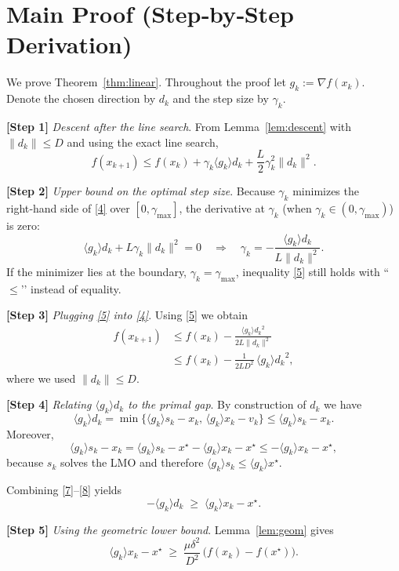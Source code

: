\documentclass{article}
\newcommand{\grad}{\nabla}
\newcommand{\inner}[1]{\langle #1\rangle}
\begin{document}
\section*{Main Proof (Step‑by‑Step Derivation)}
We prove Theorem~\ref{thm:linear}.  Throughout the proof let $g_{k}:=\grad f(x_{k})$.
Denote the chosen direction by $d_{k}$ and the step size by $\gamma_{k}$.

\noindent\textbf{[Step 1]} \emph{Descent after the line search}.  
From Lemma~\ref{lem:descent} with $\|d_{k}\|\le D$ and using the exact line search,
\[
f(x_{k+1})\le f(x_{k})+\gamma_{k}\inner{g_{k}}{d_{k}}+\frac{L}{2}\gamma_{k}^{2}\|d_{k}\|^{2}.
\tag{4}
\]

\noindent\textbf{[Step 2]} \emph{Upper bound on the optimal step size}.  
Because $\gamma_{k}$ minimizes the right‑hand side of \eqref{4} over
$[0,\gamma_{\max}]$, the derivative at $\gamma_{k}$ (when $\gamma_{k}\in(0,\gamma_{\max})$) is zero:
\[
\inner{g_{k}}{d_{k}}+L\gamma_{k}\|d_{k}\|^{2}=0
\quad\Longrightarrow\quad
\gamma_{k}= -\frac{\inner{g_{k}}{d_{k}}}{L\|d_{k}\|^{2}}.
\tag{5}
\]
If the minimizer lies at the boundary, $\gamma_{k}=\gamma_{\max}$, inequality \eqref{5}
still holds with “$\le$’’ instead of equality.

\noindent\textbf{[Step 3]} \emph{Plugging \eqref{5} into \eqref{4}}.  
Using \eqref{5} we obtain
\[
\begin{aligned}
f(x_{k+1})
&\le f(x_{k})-\frac{\inner{g_{k}}{d_{k}}^{2}}{2L\|d_{k}\|^{2}}  \\
&\le f(x_{k})-\frac{1}{2L D^{2}}\,\inner{g_{k}}{d_{k}}^{2},
\end{aligned}
\tag{6}
\]
where we used $\|d_{k}\|\le D$.

\noindent\textbf{[Step 4]} \emph{Relating $\inner{g_{k}}{d_{k}}$ to the primal gap}.  
By construction of $d_{k}$ we have
\[
\inner{g_{k}}{d_{k}}
= \min\bigl\{\inner{g_{k}}{s_{k}-x_{k}},\,
\inner{g_{k}}{x_{k}-v_{k}}\bigr\}
\le \inner{g_{k}}{s_{k}-x_{k}}.
\tag{7}
\]
Moreover,
\[
\inner{g_{k}}{s_{k}-x_{k}}
= \inner{g_{k}}{s_{k}-x^{\star}}-\inner{g_{k}}{x_{k}-x^{\star}}
\le -\inner{g_{k}}{x_{k}-x^{\star}},
\tag{8}
\]
because $s_{k}$ solves the LMO and therefore
$\inner{g_{k}}{s_{k}}\le\inner{g_{k}}{x^{\star}}$.

Combining \eqref{7}–\eqref{8} yields
\[
-\inner{g_{k}}{d_{k}}\;\ge\;\inner{g_{k}}{x_{k}-x^{\star}} .
\tag{9}
\]

\noindent\textbf{[Step 5]} \emph{Using the geometric lower bound}.  
Lemma~\ref{lem:geom} gives
\[
\inner{g_{k}}{x_{k}-x^{\star}}
\;\ge\;
\frac{\mu\delta^{2}}{D^{2}}\,
\bigl(f(x_{k})-f(x^{\star})\bigr).
\tag{10}
\]
\end{document}
